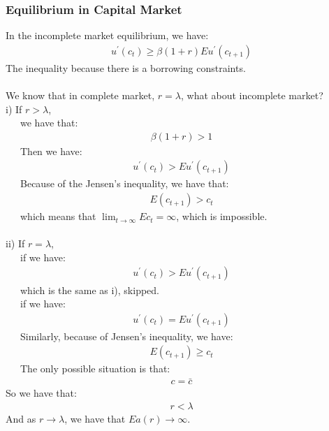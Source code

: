\documentclass{article}
\begin{document}
\subsubsection{Equilibrium in Capital Market}
In the incomplete market equilibrium, we have:
	\begin{align*}
		u^\prime(c_t) \geq \beta (1 + r)Eu^\prime(c_{t+1})
	\end{align*}
The inequality because there is a borrowing constraints.\\\\
We know that in complete market, $r = \lambda$, what about incomplete market?\\
\indent i) If $r > \lambda$, \\
\indent\ \ \ we have that:
	\begin{align*}
		\beta(1 + r) > 1
	\end{align*}
\indent\ \ \ Then we have:
	\begin{align*}
		u^\prime(c_t) > Eu^\prime(c_{t+1})
	\end{align*}
\indent\ \ \ Because of the Jensen's inequality, we have that:
	\begin{align*}
		E(c_{t+1}) > c_t
	\end{align*}
\indent\ \ \ which means that $\lim_{t \to \infty}Ec_t = \infty$, which is impossible.\\\\
\indent ii) If $r = \lambda$,\\
\indent\ \ \ if we have:
	\begin{align*}
		u^\prime(c_t) > Eu^\prime(c_{t+1})
	\end{align*} 
\indent\ \ \ which is the same as i), skipped.\\
\indent\ \ \ if we have:
	\begin{align*}
		u^\prime(c_t) = Eu^\prime(c_{t+1})
	\end{align*}
\indent\ \ \ Similarly, because of Jensen's inequality, we have:
	\begin{align*}
		E(c_{t+1}) \geq c_t
	\end{align*}	
\indent\ \ \ The only possible situation is that:
	\begin{align*}
		c = \bar{c}
	\end{align*}
So we have that:
	\begin{align*}
		r < \lambda
	\end{align*}
And as $r \to \lambda$, we have that $Ea(r) \to \infty$.
\end{document}
